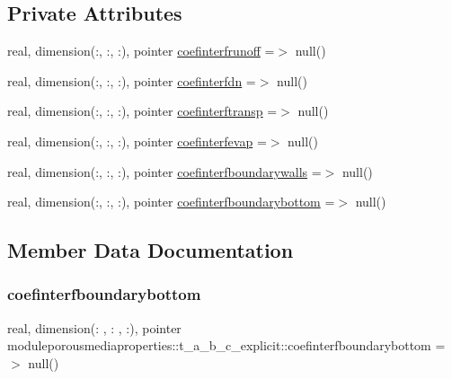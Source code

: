 \subsection*{Private Attributes}
\begin{DoxyCompactItemize}
\item 
real, dimension(\+:, \+:, \+:), pointer \mbox{\hyperlink{structmoduleporousmediaproperties_1_1t__a__b__c__explicit_ab1ffebabb607ff351213b61f8f1f6f5d}{coefinterfrunoff}} =$>$ null()
\item 
real, dimension(\+:, \+:, \+:), pointer \mbox{\hyperlink{structmoduleporousmediaproperties_1_1t__a__b__c__explicit_a033086cb3bbe57e4aa2b7e40fa2cf118}{coefinterfdn}} =$>$ null()
\item 
real, dimension(\+:, \+:, \+:), pointer \mbox{\hyperlink{structmoduleporousmediaproperties_1_1t__a__b__c__explicit_a7b32a2221c4be6e82ca0eea8923bef95}{coefinterftransp}} =$>$ null()
\item 
real, dimension(\+:, \+:, \+:), pointer \mbox{\hyperlink{structmoduleporousmediaproperties_1_1t__a__b__c__explicit_ad94cf19473f8eeafd5760661acc6fffe}{coefinterfevap}} =$>$ null()
\item 
real, dimension(\+:, \+:, \+:), pointer \mbox{\hyperlink{structmoduleporousmediaproperties_1_1t__a__b__c__explicit_ae49067ca53fbca19b67b5cd360447462}{coefinterfboundarywalls}} =$>$ null()
\item 
real, dimension(\+:, \+:, \+:), pointer \mbox{\hyperlink{structmoduleporousmediaproperties_1_1t__a__b__c__explicit_a60663e38009e0b11cd142059b7731e11}{coefinterfboundarybottom}} =$>$ null()
\end{DoxyCompactItemize}


\subsection{Member Data Documentation}
\mbox{\label{structmoduleporousmediaproperties_1_1t__a__b__c__explicit_a60663e38009e0b11cd142059b7731e11}} 
\subsubsection{\texorpdfstring{coefinterfboundarybottom}{coefinterfboundarybottom}}
{\footnotesize\ttfamily real, dimension(\+: , \+: , \+:), pointer moduleporousmediaproperties\+::t\+\_\+a\+\_\+b\+\_\+c\+\_\+explicit\+::coefinterfboundarybottom =$>$ null()\hspace{0.3cm}{\ttfamily [private]}}

